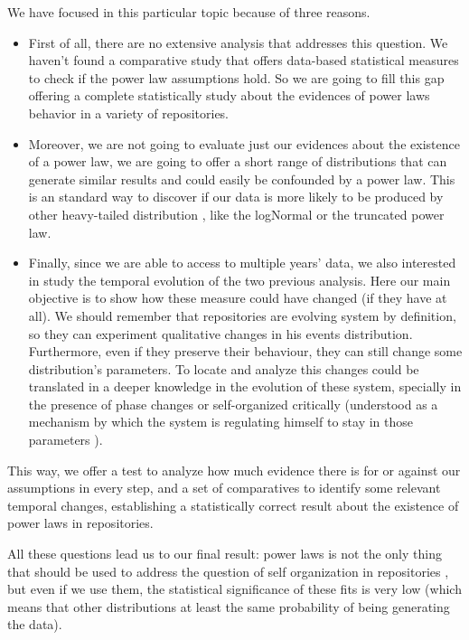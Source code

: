 \documentclass{article}
\begin{document}
We have focused in this particular topic because of three
reasons.\begin{itemize}
\item First of all, there are no extensive analysis that addresses
  this question. We haven't found a comparative study that offers
  data-based statistical measures to check if the power law
  assumptions hold.  So we are going to fill this gap offering a
  complete statistically study about the evidences of power laws
  behavior in a variety of repositories.
\item Moreover, we are not going to evaluate just our evidences about
  the existence of a power law, we are going to offer a short range of
  distributions that can generate similar results and could easily be
  confounded by a power law. This is an standard way to discover if
  our data is more likely to be produced by other heavy-tailed
  distribution \cite{clauset2009power}, like the logNormal or the
  truncated power law.
\item Finally, since we are able to access to multiple years' data, we
  also interested in study the temporal evolution of the two previous
  analysis. Here our main objective is to show how these measure could
  have changed (if they have at all). We should remember that
  repositories are evolving system by definition, so they can
  experiment qualitative changes in his events
  distribution. Furthermore, even if they preserve their behaviour,
  they can still change some distribution's parameters.  To locate and
  analyze this changes could be translated in a deeper knowledge in
  the evolution of these system, specially in the presence of phase
  changes \cite{merelo2017self} or self-organized critically
  (understood as a mechanism by which the system is regulating himself
  to stay in those parameters \cite{newman2005power}).
\end{itemize}

This way, we offer a test to analyze how much evidence there is for or
against our assumptions in every step, and a set of comparatives to
identify some relevant temporal changes, establishing a statistically
correct result about the existence of power laws in repositories.

All these questions lead us to our final result: power laws is not the only thing that should be used to address the question of self organization
in repositories \cite{alderson2010contrasting}, but even if we use
them, the statistical significance of these fits is very low (which
means that other distributions at least the same probability of being
generating the data).
\end{document}
